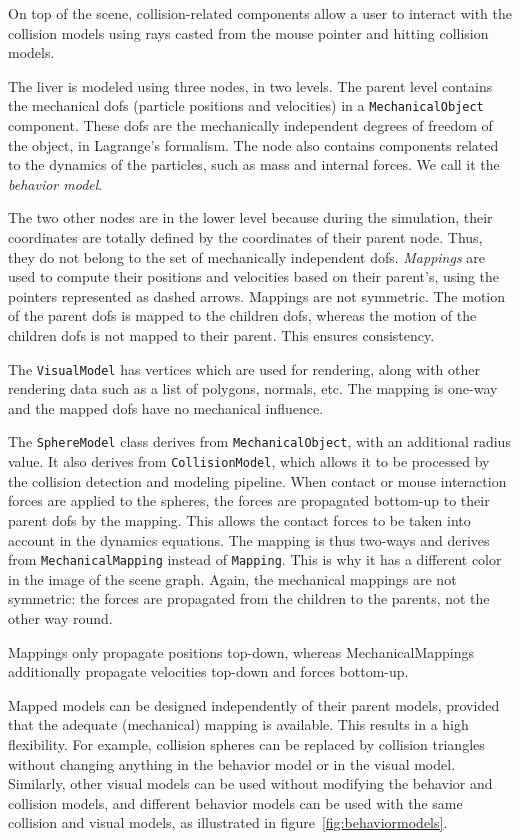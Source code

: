 On top of the scene, collision-related components allow a user to interact with the collision models using rays casted from the mouse pointer and hitting collision models. %

The liver is modeled using three nodes, in two levels. The parent level contains the mechanical dofs (particle positions and velocities) in a \texttt{MechanicalObject} component. These dofs are the mechanically independent degrees of freedom of the object, in Lagrange's formalism. The node also contains components related to the dynamics of the particles, such as mass and internal forces. We call it the \textit{behavior model}.

The two other nodes are in the lower level because during the simulation, their coordinates are totally defined by the coordinates of their parent node. Thus, they do not belong to the set of mechanically independent dofs. \emph{Mappings} are used to compute their positions and velocities based on their parent's, using the pointers represented as dashed arrows. Mappings are not symmetric. The motion of the parent dofs is mapped to the children dofs, whereas the motion of the children dofs is not mapped to their parent. This ensures consistency. 

The \texttt{VisualModel} has vertices which are used for rendering, along with other rendering data such as a list of polygons, normals, etc. The mapping is one-way and the mapped dofs have no mechanical influence.

The \texttt{SphereModel} class derives from \texttt{MechanicalObject}, with an additional radius value. It also derives from \texttt{CollisionModel}, which allows it to be processed by the collision detection and modeling pipeline. When contact or mouse interaction forces are applied to the spheres, the forces are propagated bottom-up to their parent dofs by the mapping. This allows the contact forces to be taken into account in the dynamics equations. The mapping is thus two-ways and derives from \texttt{MechanicalMapping} instead of \texttt{Mapping}. This is why it has a different color in the image of the scene graph.
Again, the mechanical mappings are not symmetric: the forces are propagated from the children to the parents, not the other way round. 

Mappings only propagate positions top-down, whereas MechanicalMappings additionally propagate velocities top-down and forces bottom-up. 

Mapped models can be designed independently of their parent models, provided that the adequate (mechanical) mapping is available. This results in a high flexibility. For example, collision spheres can be replaced by collision triangles without changing anything in the behavior model or in the visual model. Similarly, other visual models can be used without modifying the behavior and collision models, and different behavior models can be used with the same collision and visual models, as illustrated in figure~\ref{fig:behaviormodels}.

